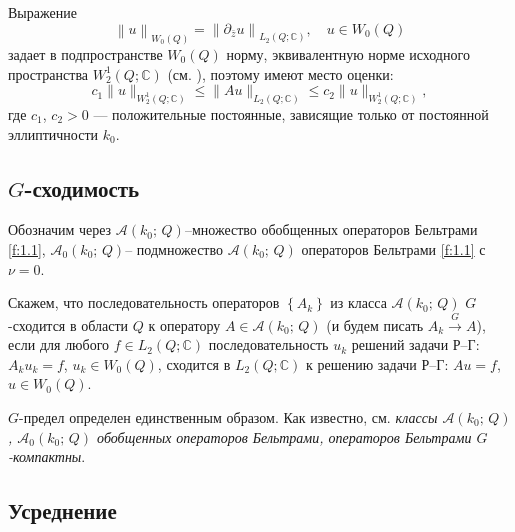 Выражение
$$
\left\| u\right\|_{W_0(Q)}=\left\| \partial_{\bar{z}}u\right\|_{L_2(Q;\mathbb{C})}, \quad u\in W_0(Q)
$$
задает в подпространстве $W_0(Q)$ норму, эквивалентную норме исходного пространства $W_2^1(Q;\mathbb{C})$ (см. \cite{1}),
поэтому имеют место оценки:
\begin{equation}\label{f:1.5}
c_1\|u\|_{W^1_2(Q;\mathbb{C})}\leqslant\|Au\|_{L_2(Q;\mathbb{C})}\leqslant c_2 \|u\|_{W^1_2(Q;\mathbb{C})},
\end{equation}
где $c_1$, $c_2>0$ --- положительные постоянные, зависящие только от постоянной эллиптичности $k_0$.

\subsection{$G$-сходимость}\label{shpr}
\noindent Обозначим через $\mathscr{A}(k_0;\,Q)$--множество обобщенных  операторов Бельтрами \eqref{f:1.1}, $\mathscr{A}_0(k_0;\,Q)$-- подмножество $\mathscr{A}(k_0;\,Q)$  операторов Бельтрами \eqref{f:1.1} с $\nu=0$.

\begin{definition}
Скажем, что последовательность операторов $\left\{ \textit {A}_k\right\}$ из класса $\mathscr{A}(k_0;\,Q)$
$G$-сходится в области $Q$ к оператору $A\in \mathscr{A}(k_0;\,Q)$ (и будем писать $A_k\overset{G}{\longrightarrow} A$),
если для любого $f\in L_2(Q;\mathbb{C})$ последовательность $u_k$ решений задачи Р--Г: $A_ku_k=f$, $u_k\in W_0(Q)$,
сходится в $L_2(Q;\mathbb{C})$ к решению задачи Р--Г: $Au=f$, $u\in W_0(Q)$.
\end{definition}

$G$-предел определен единственным образом.
Как известно, см. \cite{1,6}
\textit{ классы $\mathscr{A}(k_0;\,Q)$, $\mathscr{A}_0(k_0;\,Q)$ обобщенных
операторов Бельтрами, операторов Бельтрами $G$-компактны}.

\subsection{ Усреднение}\label{Usred}

